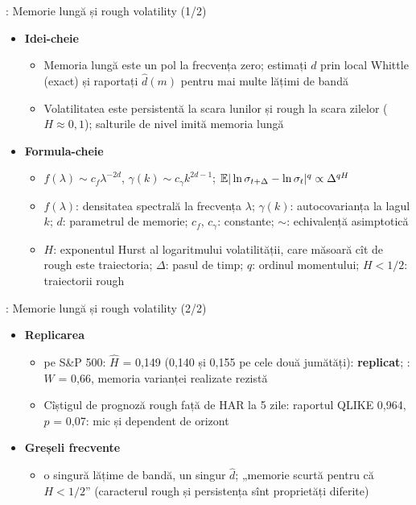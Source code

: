 \begin{frame}{: Memorie lungă și rough volatility (1/2)}
\itemsize{\footnotesize}
\begin{itemize}
    \item \textbf{Idei-cheie}
    \begin{itemize}
        \item Memoria lungă este un pol la frecvența zero; estimați $d$ prin local Whittle (exact) și raportați $\hat d(m)$ pentru mai multe lățimi de bandă
        \item Volatilitatea este persistentă la scara lunilor și rough la scara zilelor ($H \approx 0{,}1$); salturile de nivel imită memoria lungă
    \end{itemize}
    \item \textbf{Formula-cheie}
    \begin{itemize}
        \item $f(\lambda) \sim c_f\lambda^{-2d}$, $\gamma(k) \sim c_\gamma k^{2d-1}$; $\mathbb{E}|\ln\sigma_{t+\Delta} - \ln\sigma_t|^q \propto \Delta^{qH}$
        \item $f(\lambda)$: densitatea spectrală la frecvența $\lambda$; $\gamma(k)$: autocovarianța la lagul $k$; $d$: parametrul de memorie; $c_f$, $c_\gamma$: constante; $\sim$: echivalență asimptotică
        \item $H$: exponentul Hurst al logaritmului volatilității, care măsoară cît de rough este traiectoria; $\Delta$: pasul de timp; $q$: ordinul momentului; $H < 1/2$: traiectorii rough
    \end{itemize}
\end{itemize}
\end{frame}

\begin{frame}{: Memorie lungă și rough volatility (2/2)}
\itemsize{\small}
\begin{itemize}
    \item \textbf{Replicarea}
    \begin{itemize}
        \item {} pe S\&P 500: $\hat H$ = 0{,}149 (0{,}140 și 0{,}155 pe cele două jumătăți): \textbf{replicat}; : $W$ = 0{,}66, memoria varianței realizate rezistă
        \item Cîștigul de prognoză rough față de HAR la 5 zile: raportul QLIKE 0{,}964, $p$ = 0{,}07: mic și dependent de orizont
    \end{itemize}
    \item \textbf{Greșeli frecvente}
    \begin{itemize}
        \item o singură lățime de bandă, un singur $\hat d$; „memorie scurtă pentru că $H < 1/2$” (caracterul rough și persistența sînt proprietăți diferite)
    \end{itemize}
\end{itemize}
\end{frame}

